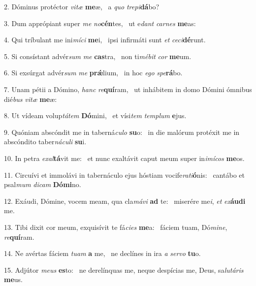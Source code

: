 2. Dóminus protéctor \textit{vi}\textit{tæ} \textbf{me}æ, \ast\  a \textit{quo} \textit{tre}\textit{pi}\textbf{dá}bo?\

3. Dum apprópiant super \textit{me} \textit{no}\textbf{cén}tes, \ast\  ut e\textit{dant} \textit{car}\textit{nes} \textbf{me}as:\

4. Qui tríbulant me ini\textit{mí}\textit{ci} \textbf{me}i, \ast\  ipsi infirmáti sunt \textit{et} \textit{ce}\textit{ci}\textbf{dé}runt.\

5. Si consístant advér\textit{sum} \textit{me} \textbf{cas}tra, \ast\  non ti\textit{mé}\textit{bit} \textit{cor} \textbf{me}um.\

6. Si exsúrgat advér\textit{sum} \textit{me} \textbf{prǽ}lium, \ast\  in hoc \textit{e}\textit{go} \textit{spe}\textbf{rá}bo.\

7. Unam pétii a Dómino, \textit{hanc} \textit{re}\textbf{quí}ram, \ast\  ut inhábitem in domo Dómini ómnibus dié\textit{bus} \textit{vi}\textit{tæ} \textbf{me}æ:\

8. Ut vídeam volup\textit{tá}\textit{tem} \textbf{Dó}mini, \ast\  et vísi\textit{tem} \textit{tem}\textit{plum} \textbf{e}jus.\

9. Quóniam abscóndit me in taberná\textit{cu}\textit{lo} \textbf{su}o: \ast\  in die malórum protéxit me in abscóndito taber\textit{ná}\textit{cu}\textit{li} \textbf{su}i.\

10. In petra \textit{ex}\textit{al}\textbf{tá}vit me: \ast\  et nunc exaltávit caput meum super in\textit{i}\textit{mí}\textit{cos} \textbf{me}os.\

11. Circuívi et immolávi in tabernáculo ejus hóstiam vocife\textit{ra}\textit{ti}\textbf{ó}nis: \ast\  cantábo et psal\textit{mum} \textit{di}\textit{cam} \textbf{Dó}\textbf{mi}no.\

12. Exáudi, Dómine, vocem meam, qua cla\textit{má}\textit{vi} \textbf{ad} te: \ast\  miserére me\textit{i}, \textit{et} \textit{ex}\textbf{áu}\textbf{di} me.\

13. Tibi dixit cor meum, exquisívit te fá\textit{ci}\textit{es} \textbf{me}a: \ast\  fáciem tuam, Dó\textit{mi}\textit{ne}, \textit{re}\textbf{quí}ram.\

14. Ne avértas fáciem \textit{tu}\textit{am} \textbf{a} me, \ast\  ne declínes in ira \textit{a} \textit{ser}\textit{vo} \textbf{tu}o.\

15. Adjútor \textit{me}\textit{us} \textbf{es}to: \ast\  ne derelínquas me, neque despícias me, Deus, sa\textit{lu}\textit{tá}\textit{ris} \textbf{me}us.\

